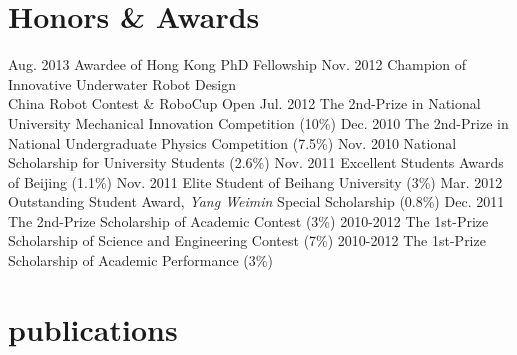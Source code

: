 \documentclass[]{friggeri-cv}
\begin{document}
\section{Honors \& Awards}

\begin{entrylist}
  \entry
    {Aug. 2013}
    {Awardee of Hong Kong PhD Fellowship}
    {}
    {}
  \entry
    {Nov. 2012}
    {Champion of Innovative Underwater Robot Design \\
    China Robot Contest \& RoboCup Open}
    {}
    {}
  \entry
    {Jul. 2012}
    {The 2nd-Prize in National University Mechanical Innovation Competition}
    {}
    {(10\%)}
  \entry
    {Dec. 2010}
    {The 2nd-Prize in National Undergraduate Physics Competition}
    {}
    {(7.5\%)}
  \entry
    {Nov. 2010}
    {National Scholarship for University Students}
    {}
    {(2.6\%)}
  \entry
    {Nov. 2011}
    {Excellent Students Awards of Beijing}
    {}
    {(1.1\%)}
  \entry
    {Nov. 2011}
    {Elite Student of Beihang University}
    {}
    {(3\%)}
  \entry
    {Mar. 2012}
    {Outstanding Student Award, \textit{Yang Weimin} Special Scholarship}
    {}
    {(0.8\%)}
  \entry
    {Dec. 2011}
    {The 2nd-Prize Scholarship of Academic Contest}
    {}
    {(3\%)}
  \entry
    {2010-2012}
    {The 1st-Prize Scholarship of Science and Engineering Contest}
    {}
    {(7\%)}
  \entry
    {2010-2012}
    {The 1st-Prize Scholarship of Academic Performance}
    {}
    {(3\%)}
\end{entrylist}

\section{publications}


\end{document}
